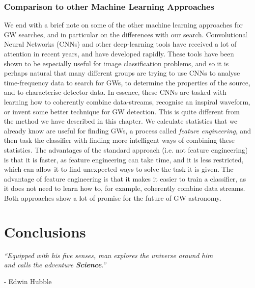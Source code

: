 \documentclass[11pt]{cuthesis}
\begin{document}
\subsection{Comparison to other Machine Learning Approaches}
We end with a brief note on some of the other machine learning approaches for GW searches, and in particular on the differences with our search. Convolutional Neural Networks (CNNs) and other deep-learning tools have received a lot of attention in recent years, and have developed rapidly. These tools have been shown to be especially useful for image classification problems, and so it is perhaps natural that many different groups are trying to use CNNs to analyse time-frequency data to search for GWs, \cite{George:2017vlv,Gebhard:2019ldz} to determine the properties of the source, \cite{Shen:2019vep} and to characterise detector data. \cite{Coughlin:2019ref} In essence, these CNNs are tasked with learning how to coherently combine data-streams, recognise an inspiral waveform, or invent some better technique for GW detection. This is quite different from the method we have described in this chapter. We calculate statistics that we already know are useful for finding GWs, a process called \textit{feature engineering}, and then task the classifier with finding more intelligent ways of combining these statistics. The advantages of the standard approach (i.e. not feature engineering) is that it is faster, as feature engineering can take time, and it is less restricted, which can allow it to find unexpected ways to solve the task it is given. The advantage of feature engineering is that it makes it easier to train a classifier, as it does not need to learn how to, for example, coherently combine data streams. Both approaches show a lot of promise for the future of GW astronomy. 


\chapter{Conclusions}
\begin{center}

\textit{``Equipped with his five senses, man explores the universe around him\\ and calls the adventure \textbf{Science}.''}
\end{center}
\begin{flushright}

- Edwin Hubble
\end{flushright}

\vspace{20pt}
\end{document}
